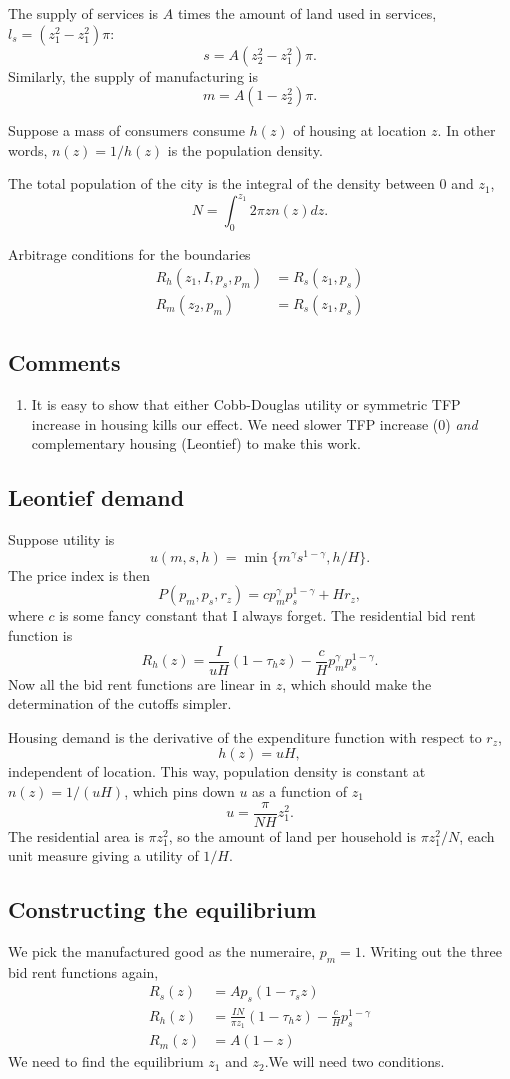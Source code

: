 \documentclass[letter]{amsart}
\theoremstyle{definition}
\theoremstyle{remark}
\numberwithin{equation}{section}
\begin{document}
The supply of services is $A$ times the amount of land used in services, $l_s = (z_1^2-z_1^2)\pi$:
\[
s = A(z_2^2-z_1^2)\pi.
\]
Similarly, the supply of manufacturing is
\[
m = A(1-z_2^2)\pi.
\]

Suppose a mass of consumers consume $h(z)$ of housing at location $z$. In other words, $n(z) = 1/h(z)$ is the population density. 

The total population of the city is the integral of the density between $0$ and $z_1$,
\[
N = \int_{0}^{z_1}2\pi z n(z) dz.
\]

Arbitrage conditions for the boundaries
\begin{align}
R_h(z_1,I,p_s,p_m) &= R_s(z_1,p_s)\\
R_m(z_2,p_m) &= R_s(z_1,p_s)
\end{align}
\subsection{Comments}
\begin{enumerate}
  \item It is easy to show that either Cobb-Douglas utility or symmetric TFP increase in housing kills our effect. We need slower TFP increase (0) \emph{and} complementary housing (Leontief) to make this work.
\end{enumerate}
\subsection{Leontief demand}
Suppose utility is
\[
u(m,s,h) = \min\{m^\gamma s^{1-\gamma}, h/H\}.
\]
The price index is then
\[
P(p_m,p_s,r_z) = c p_m^\gamma p_s^{1-\gamma} + H r_z,
\]
where $c$ is some fancy constant that I always forget. The residential bid rent function is 
\[
R_h(z) = \frac{I}{uH}(1-\tau_h z) -\frac cH p_m^\gamma p_s^{1-\gamma}.
\]
Now all the bid rent functions are linear in $z$, which should make the determination of the cutoffs simpler.

Housing demand is the derivative of the expenditure function with respect to $r_z$,
\[
h(z) = u H,
\]
independent of location. This way, population density is constant at $n(z) = 1/(uH)$, which pins down $u$ as a function of $z_1$
\[
u = \frac{\pi}{N H}z_1^2.
\]
The residential area is $\pi z_1^2$, so the amount of land per household is $\pi z_1^2/N$, each unit measure giving a utility of $1/H$.

\subsection{Constructing the equilibrium}
We pick the manufactured good as the  numeraire, $p_m=1$. Writing out the three bid rent functions again,
\begin{align*}
R_s(z) &= Ap_s(1-\tau_s z)\\
R_h(z) &= \frac{IN}{\pi z_1}(1-\tau_h z) -\frac {c}{H} p_s^{1-\gamma}\\
R_m(z) &= A(1-z)
\end{align*}
We need to find the equilibrium $z_1$ and $z_2$.We will need two conditions. 
\end{document}
